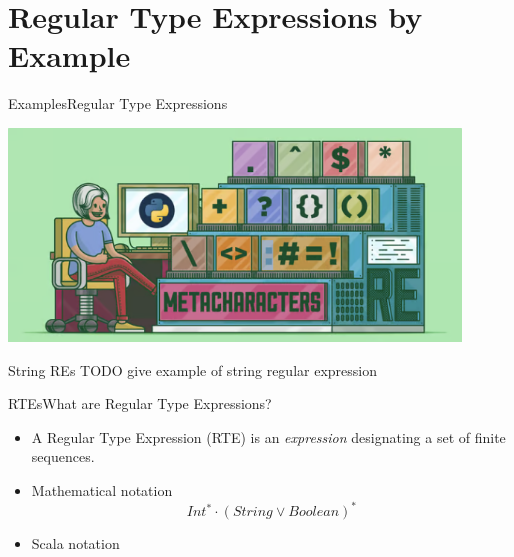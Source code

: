 \section{Regular Type Expressions by Example}

\begin{frame}{Examples}{Regular Type Expressions}
  \centering
  
  \includegraphics[width=0.9\textwidth]{regexp.png}
\end{frame}
\begin{frame}{String REs}
  TODO give example of string regular expression
\end{frame}


\newsavebox\exnotebox
\begin{lrbox}{\exnotebox}
  \begin{minipage}{7cm}
    
  \end{minipage}
\end{lrbox}


\begin{frame}{RTEs}{What are Regular Type Expressions?}
  \begin{itemize}
  \item A Regular Type Expression (RTE) is an \emph{expression} designating a set  of finite sequences.
  \item Mathematical notation
    \[Int^* \cdot (String \vee Boolean)^*\]
  \item Scala notation\\
    \usebox\exnotebox
  \end{itemize}
\end{frame}
